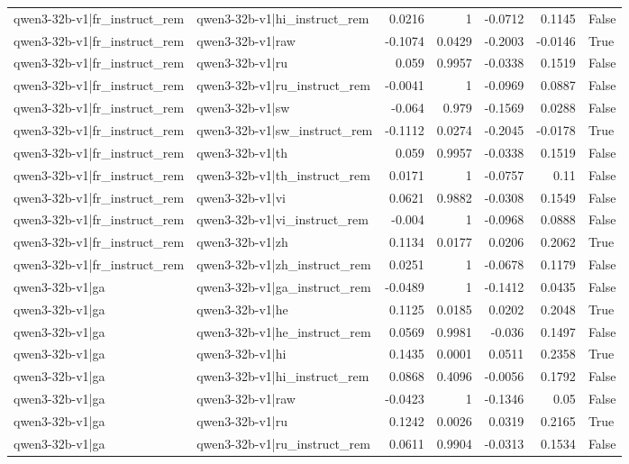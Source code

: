 \begin{table}
\begin{tabular}{l l r r r r l}
qwen3-32b-v1|fr_instruct_rem & qwen3-32b-v1|hi_instruct_rem & 0.0216 & 1 & -0.0712 & 0.1145 & False \\
qwen3-32b-v1|fr_instruct_rem & qwen3-32b-v1|raw & -0.1074 & 0.0429 & -0.2003 & -0.0146 & True \\
qwen3-32b-v1|fr_instruct_rem & qwen3-32b-v1|ru & 0.059 & 0.9957 & -0.0338 & 0.1519 & False \\
qwen3-32b-v1|fr_instruct_rem & qwen3-32b-v1|ru_instruct_rem & -0.0041 & 1 & -0.0969 & 0.0887 & False \\
qwen3-32b-v1|fr_instruct_rem & qwen3-32b-v1|sw & -0.064 & 0.979 & -0.1569 & 0.0288 & False \\
qwen3-32b-v1|fr_instruct_rem & qwen3-32b-v1|sw_instruct_rem & -0.1112 & 0.0274 & -0.2045 & -0.0178 & True \\
qwen3-32b-v1|fr_instruct_rem & qwen3-32b-v1|th & 0.059 & 0.9957 & -0.0338 & 0.1519 & False \\
qwen3-32b-v1|fr_instruct_rem & qwen3-32b-v1|th_instruct_rem & 0.0171 & 1 & -0.0757 & 0.11 & False \\
qwen3-32b-v1|fr_instruct_rem & qwen3-32b-v1|vi & 0.0621 & 0.9882 & -0.0308 & 0.1549 & False \\
qwen3-32b-v1|fr_instruct_rem & qwen3-32b-v1|vi_instruct_rem & -0.004 & 1 & -0.0968 & 0.0888 & False \\
qwen3-32b-v1|fr_instruct_rem & qwen3-32b-v1|zh & 0.1134 & 0.0177 & 0.0206 & 0.2062 & True \\
qwen3-32b-v1|fr_instruct_rem & qwen3-32b-v1|zh_instruct_rem & 0.0251 & 1 & -0.0678 & 0.1179 & False \\
qwen3-32b-v1|ga & qwen3-32b-v1|ga_instruct_rem & -0.0489 & 1 & -0.1412 & 0.0435 & False \\
qwen3-32b-v1|ga & qwen3-32b-v1|he & 0.1125 & 0.0185 & 0.0202 & 0.2048 & True \\
qwen3-32b-v1|ga & qwen3-32b-v1|he_instruct_rem & 0.0569 & 0.9981 & -0.036 & 0.1497 & False \\
qwen3-32b-v1|ga & qwen3-32b-v1|hi & 0.1435 & 0.0001 & 0.0511 & 0.2358 & True \\
qwen3-32b-v1|ga & qwen3-32b-v1|hi_instruct_rem & 0.0868 & 0.4096 & -0.0056 & 0.1792 & False \\
qwen3-32b-v1|ga & qwen3-32b-v1|raw & -0.0423 & 1 & -0.1346 & 0.05 & False \\
qwen3-32b-v1|ga & qwen3-32b-v1|ru & 0.1242 & 0.0026 & 0.0319 & 0.2165 & True \\
qwen3-32b-v1|ga & qwen3-32b-v1|ru_instruct_rem & 0.0611 & 0.9904 & -0.0313 & 0.1534 & False \\

\end{tabular}
\end{table}

